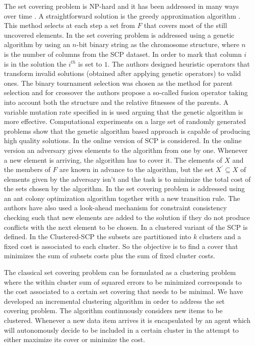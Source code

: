 The set covering problem is NP-hard and it has been addressed in many ways over time \cite{Gouwanda08Evolutionary, 	Crawford11AHybrid, Catalano01Parallel,Beasley96AGenetic,Alon03OnlineSCP,Alfandari10ClusteredSCP}. A straightforward solution is the greedy approximation algorithm \cite{Cormen09Introduction}. This method selects at each step a set from $F$ that covers most of the still uncovered elements.
In \cite{Beasley96AGenetic} the set covering problem is addressed using a genetic algorithm by using an $n$-bit binary string as the chromosome structure, where $n$ is the number of columns from the SCP dataset. In order to mark that column $i$ is in the solution the $i^{th}$ is set to $1$. The authors designed heuristic operators that transform invalid solutions (obtained after applying genetic operators) to valid ones. The binary tournament
selection was chosen as the method for parent selection and for crossover the authors propose a so-called  fusion operator taking into account both the structure and the relative fitnesses of the parents. A variable mutation rate specified in \cite{Beasley96AGenetic} is used arguing that the genetic algorithm is more effective. Computational experiments on a large set of randomly generated problems show that the genetic algorithm based approach is capable of producing high quality solutions. 
In \cite{Alon03OnlineSCP} the online version of SCP is considered. In the online version an adversary gives elements to the algorithm from one by one. Whenever a new element is arriving, the algorithm has to cover it.  The elements of $X$ and the members of $F$ are known in advance to the algorithm, but the set $X^{'} \subseteq X$ of
elements given by the adversary isn't and the task is to minimize the total cost of the sets chosen by the algorithm. 
In \cite{Crawford11AHybrid} the set covering problem is addressed using an ant colony optimization algorithm together with a new transition rule. The authors have also used a look-ahead mechanism for constraint consistency checking such that new elements are added to the solution if they do not produce conflicts with the next element to be chosen.
In \cite{Alfandari10ClusteredSCP} a clustered variant of the SCP is defined. In the Clustered-SCP the subsets are partitioned into $k$ clusters and a fixed cost is associated to each cluster. So the objective is to find a cover that minimizes the sum of subsets costs plus the sum of fixed cluster costs.

The classical set covering problem can be formulated as a clustering problem where the within cluster sum of squared errors to be minimized corresponds to the cost associated to a certain set covering that needs to be minimal. We have developed an incremental clustering algorithm in order to address the set covering problem. The algorithm continuously considers new items to be clustered. Whenever a new data item arrives it is encapsulated by an agent which will autonomously decide to be included in a certain cluster in the attempt to either maximize its cover or minimize the cost. 

